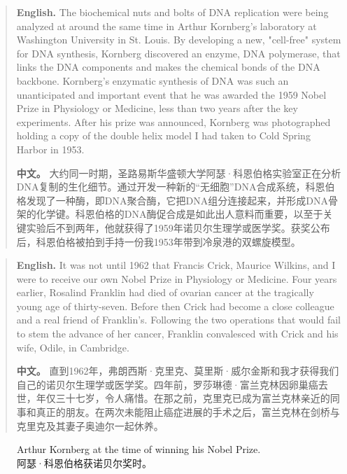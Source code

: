 \begin{quote}
\noindent\textbf{English.} The biochemical nuts and bolts of DNA replication were being analyzed at around the same time in Arthur Kornberg's laboratory at Washington University in St. Louis. By developing a new, "cell-free" system for DNA synthesis, Kornberg discovered an enzyme, DNA polymerase, that links the DNA components and makes the chemical bonds of the DNA backbone. Kornberg's enzymatic synthesis of DNA was such an unanticipated and important event that he was awarded the 1959 Nobel Prize in Physiology or Medicine, less than two years after the key experiments. After his prize was announced, Kornberg was photographed holding a copy of the double helix model I had taken to Cold Spring Harbor in 1953.

\smallskip
\noindent\textbf{中文。} 大约同一时期，圣路易斯华盛顿大学阿瑟·科恩伯格实验室正在分析DNA复制的生化细节。通过开发一种新的“无细胞”DNA合成系统，科恩伯格发现了一种酶，即DNA聚合酶，它把DNA组分连接起来，并形成DNA骨架的化学键。科恩伯格的DNA酶促合成是如此出人意料而重要，以至于关键实验后不到两年，他就获得了1959年诺贝尔生理学或医学奖。获奖公布后，科恩伯格被拍到手持一份我1953年带到冷泉港的双螺旋模型。
\end{quote}

\begin{quote}
\noindent\textbf{English.} It was not until 1962 that Francis Crick, Maurice Wilkins, and I were to receive our own Nobel Prize in Physiology or Medicine. Four years earlier, Rosalind Franklin had died of ovarian cancer at the tragically young age of thirty-seven. Before then Crick had become a close colleague and a real friend of Franklin's. Following the two operations that would fail to stem the advance of her cancer, Franklin convalesced with Crick and his wife, Odile, in Cambridge.

\smallskip
\noindent\textbf{中文。} 直到1962年，弗朗西斯·克里克、莫里斯·威尔金斯和我才获得我们自己的诺贝尔生理学或医学奖。四年前，罗莎琳德·富兰克林因卵巢癌去世，年仅三十七岁，令人痛惜。在那之前，克里克已成为富兰克林亲近的同事和真正的朋友。在两次未能阻止癌症进展的手术之后，富兰克林在剑桥与克里克及其妻子奥迪尔一起休养。
\end{quote}

\begin{figure}[htbp]
\centering
{}
\caption{Arthur Kornberg at the time of winning his Nobel Prize.\\阿瑟·科恩伯格获诺贝尔奖时。}
\end{figure}

